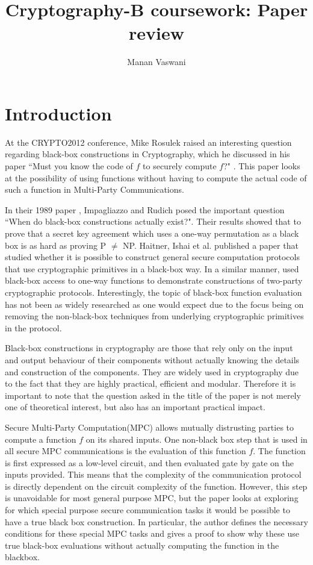 \documentclass[11pt]{article}
\theoremstyle{theorem}
\theoremstyle{theorem}
\theoremstyle{remark}
\theoremstyle{note}
\theoremstyle{plain}
\theoremstyle{definition}
\begin{document}
\title{Cryptography-B coursework: Paper review}
\author{Manan Vaswani}

\maketitle

\section{Introduction}
At the CRYPTO2012 conference, Mike Rosulek raised an interesting question regarding black-box constructions in Cryptography, which he discussed in his paper ``Must you know the code of $f$ to securely compute $f$?"  \cite{C:Rosulek12a}. This paper looks at the possibility of using functions without having to compute the actual code of such a function in Multi-Party Communications.

In their 1989 paper \cite{STOC:ImpRud89}, Impagliazzo and Rudich posed the important question ``When do black-box constructions actually exist?". Their results showed that to prove that a secret key agreement which uses a one-way permutation as a black box is as hard as proving P $\neq$ NP. Haitner, Ishai et al. published a paper \cite{EPRINT:HIKLP10} that studied whether it is possible to construct general secure computation protocols that use cryptographic primitives in a black-box way. In a similar manner, \cite{TCC:PasWee09} used black-box access to one-way functions to demonstrate constructions of two-party cryptographic protocols. Interestingly, the topic of black-box function evaluation has not been as widely researched as one would expect due to the focus being on removing the non-black-box techniques from underlying cryptographic primitives in the protocol. 

Black-box constructions in cryptography are those that rely only on the input and output behaviour of their components without actually knowing the details and construction of the components. They are widely used in cryptography due to the fact that they are highly practical, efficient and modular. Therefore it is important to note that the question asked in the title of the paper is not merely one of theoretical interest, but also has an important practical impact.

Secure Multi-Party Computation(MPC) allows mutually distrusting parties to compute a function $f$ on its shared inputs. One non-black box step that is used in all secure MPC communications is the evaluation of this function $f$. The function is first expressed as a low-level circuit, and then evaluated gate by gate on the inputs provided. This means that the complexity of the communication protocol is directly dependent on the circuit complexity of the function. However, this step is unavoidable for most general purpose MPC, but the paper looks at exploring for which special purpose secure communication tasks it would be possible to have a true black box construction.  In particular, the author defines the necessary conditions for these special MPC tasks and gives a proof to show why these use true black-box evaluations without actually computing the function in the blackbox.
\end{document}

